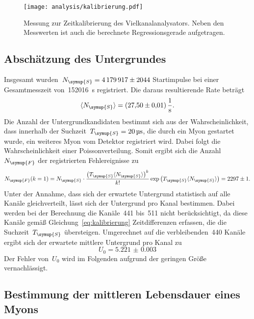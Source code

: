 \begin{figure}[htb]
  \centering
  \texttt{[image: analysis/kalibrierung.pdf]}
  \caption{Messung zur Zeitkalibrierung des Vielkanalanalysators. Neben den
  Messwerten ist auch die berechnete Regressionsgerade aufgetragen.}
  \label{fig:kalibrierung}
\end{figure}

\subsection{Abschätzung des Untergrundes}

Insgesamt wurden~$N_{\symup{S}}=\num{4179917(2044)}$ Startimpulse bei einer
Gesamtmesszeit von~\SI{152016}{\second} registriert. Die daraus resultierende
Rate beträgt
%
\begin{equation}
  \langle N_{\symup{S}}\rangle=\SI{27.50(1)}{\per\second}.
  \label{eq:rate_start}
\end{equation}
%
Die Anzahl der Untergrundkandidaten bestimmt sich aus der Wahrscheinlichkeit,
dass innerhalb der Suchzeit~$T_{\symup{S}}=\SI{20}{\micro\second}$, die durch
ein Myon gestartet wurde, ein weiteres Myon vom Detektor registriert wird. Dabei
folgt die Wahrscheinlichkeit einer Poissonverteilung. Somit ergibt sich die
Anzahl~$N_{\symup{F}}$ der registrierten Fehlereignisse zu
%
\begin{equation}
  N_{\symup{F}}(k=1)=N_{\symup{S}}\cdot\frac{\left(T_{\symup{S}}\langle N_{\symup{S}}\rangle\right)^k}{k!}\exp\left(T_{\symup{S}}\langle N_{\symup{S}}\rangle\right)=\num{2297(1)}.
  \label{eq:untergrund_gesamt}
\end{equation}
%
Unter der Annahme, dass sich der erwartete Untergrund statistisch auf alle
Kanäle gleichverteilt, lässt sich der Untergrund pro Kanal bestimmen. Dabei
werden bei der Berechnung die Kanäle~\num{441} bis~\num{511} nicht berücksichtigt, da
diese Kanäle gemäß Gleichung~\ref{eq:kalibrierung} Zeitdifferenzen erfassen, die
die Suchzeit~$T_{\symup{S}}$ übersteigen. Umgerechnet auf die
verbleibenden~\num{440} Kanäle ergibt sich der erwartete mittlere Untergrund pro
Kanal zu
%
\begin{equation}
  U_0=\num{5.221(3)}
  \label{eq:untergrund_kanal}
\end{equation}
%
Der Fehler von~$U_0$ wird im Folgenden aufgrund der geringen Größe
vernachlässigt.

\subsection{Bestimmung der mittleren Lebensdauer eines Myons}

